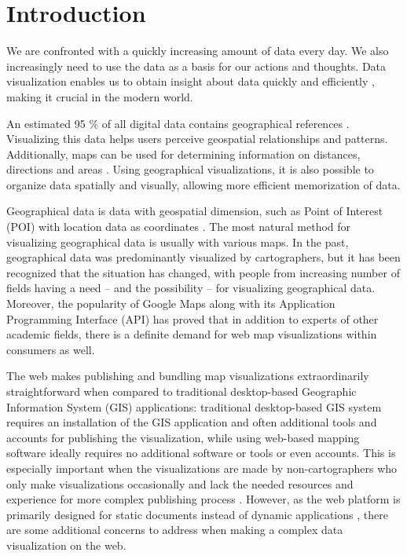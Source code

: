 
\chapter{Introduction}
\label{chapter:intro}


We are confronted with a quickly increasing amount of data every day. We also increasingly need to use the data as a basis for our actions and thoughts. Data visualization enables us to obtain insight about data quickly and efficiently \citep{van_wijk_value_2005}, making it crucial in the modern world. 

An estimated 95 \% of all digital data contains geographical references \citep{perkins_have_2010}. Visualizing this data helps users perceive geospatial relationships and patterns. Additionally, maps can be used for determining information on distances, directions and areas \citep[chap.~1.1]{kraak_cartography_2011}. Using geographical visualizations, it is also possible to organize data spatially and visually, allowing more efficient memorization of data.

Geographical data is data with geospatial dimension, such as Point of Interest (POI) with location data as coordinates \citep[chap.~1.2]{kraak_cartography_2011}. The most natural method for visualizing geographical data is usually with various maps. In the past, geographical data was predominantly visualized by cartographers, but it has been recognized \citep{kraak_visualization_1999} that the situation has changed, with people from increasing number of fields having a need -- and the possibility \citep[chap.~1]{slocum_thematic_2014} -- for visualizing geographical data. Moreover, the popularity of Google Maps \citep{google_maps_2005-1} along with its Application Programming Interface (API) \citep{google_maps_2005} has proved that in addition to experts of other academic fields, there is a definite demand for web map visualizations within consumers as well. 

The web makes publishing and bundling map visualizations extraordinarily straightforward when compared to traditional desktop-based Geographic Information System (GIS) applications: traditional desktop-based GIS system requires an installation of the GIS application and often additional tools and accounts for publishing the visualization, while using web-based mapping software ideally requires no additional software or tools or even accounts. This is especially important when the visualizations are made by non-cartographers who only make visualizations occasionally and lack the needed resources and experience for more complex publishing process \citep{miller_beast_2006}. However, as the web platform is primarily designed for static documents \citep{berners-lee_information_1989,berners-lee_world-wide_1992} instead of dynamic applications \citep{jazayeri_trends_2007}, there are some additional concerns to address when making a complex data visualization on the web.

